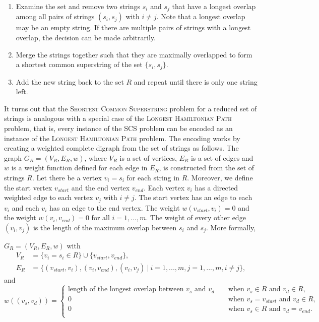 \documentclass[english,twoside,censored,csm,algorithms-track-2020]{HYthesisML}
\theoremstyle{plain}
\theoremstyle{definition}
\begin{document}
\vspace{1cm}
\begin{enumerate}
\item Examine the set and remove two strings $s_i$ and $s_j$ that have a longest overlap among all pairs of strings $(s_i, s_j)$ with $i\neq j$. Note that a longest overlap may be an empty string. If there are multiple pairs of strings with a longest overlap, the decision can be made arbitrarily.
\item Merge the strings together such that they are maximally overlapped to form a shortest common superstring of the set $\{s_i, s_j\}$.
  \item Add the new string back to the set $R$ and repeat until there is only one string left.
\end{enumerate}

It turns out that the \textsc{Shortest Common Superstring} problem for a reduced set of strings is
analogous with a special case of
the \textsc{Longest Hamiltonian Path} problem, that is, every instance of the SCS problem can be encoded
as an instance of the \textsc{Longest Hamiltonian Path} problem. The encoding works by creating a weighted
complete digraph from the set of strings as follows. 
The graph $G_R=(V_R,E_R,w)$, where $V_R$ is a set of vertices, $E_R$ is a set of edges and $w$ is a
 weight function defined for each edge in $E_R$, is constructed from the set of strings $R$.
Let there be a vertex $v_i=s_i$ for each string in $R$. Moreover, we define the start vertex
$v_{start}$ and the end vertex $v_{end}$. Each vertex $v_i$ has a directed weighted edge to each vertex
$v_j$ with $i\neq j$. The start vertex has an edge to each $v_i$ and each $v_i$ has an edge to the
end vertex. The weight $w(v_{start}, v_i) = 0$ and the weight $w(v_i, v_{end}) = 0$ for all $i=1,...,m$.
The weight of every other edge $(v_i, v_j)$ is the length of the maximum overlap between $s_i$ and $s_j$.
More formally,

$G_R=(V_R,E_R,w)$ with
\begin{align*}
  V_R &= \{v_i=s_i\in R\} \cup \{v_{start},v_{end}\}, \\
  E_R &= \{(v_{start},v_i), (v_i,v_{end}), (v_i,v_j)~|~i=1,...,m, j=1,...,m, i\neq j\},
\end{align*}
and
\[   
w((v_s,v_d)) = 
     \begin{cases}
       \text{length of the longest overlap between } v_s \text{ and } v_d &\quad\text{ when } v_s\in R \text{ and } v_d\in R,  \\
       0 &\quad\text{ when } v_s=v_{start} \text{ and } v_d\in R, \\
       0 &\quad\text{ when } v_s\in R \text{ and } v_d=v_{end}. \\
     \end{cases}
     \]
\end{document}

